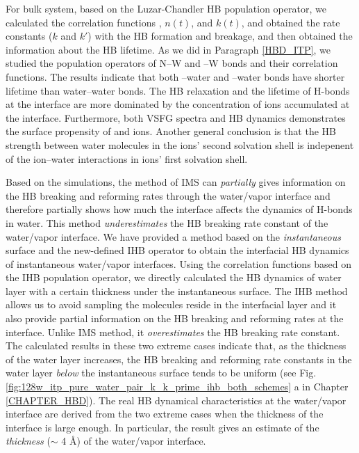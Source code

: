 For bulk system, based on the Luzar-Chandler HB population operator, 
we calculated the correlation functions \CHB, $n(t)$, and $k(t)$, and obtained the rate constants ($k$ and $k'$) with the HB formation and breakage, 
and then obtained the information about the HB lifetime. 
As we did in Paragraph \ref{HBD_ITP}, we studied the population operators of N--W 
and \I--W bonds and their correlation functions. 
The results indicate that both \nitrate--water and \I--water bonds have shorter lifetime than water--water bonds.
The HB relaxation and the lifetime of H-bonds
at the interface are more dominated by the concentration of ions accumulated at the interface. 
Furthermore, both VSFG spectra and HB dynamics demonstrates the surface propensity of \nitrate and \I ions.
Another general conclusion is that the HB strength between water molecules in the ions' second solvation shell is indepenent 
of the ion--water interactions in ions' first solvation shell.

Based on the simulations, the method of IMS can \emph{partially} gives information on the HB breaking and reforming
rates through the water/vapor interface and therefore partially shows how much the interface affects the dynamics of H-bonds in water. 
This method \emph{underestimates} the HB breaking rate constant of the water/vapor interface. 
We have provided a method based on the \emph{instantaneous} surface and the new-defined
IHB operator to obtain the interfacial HB dynamics of instantaneous water/vapor interfaces.  
Using the correlation functions based on the IHB population operator, we directly calculated the HB dynamics of water layer with a certain thickness 
under the instantaneous surface. 
The IHB method allows us to avoid sampling the molecules reside in the interfacial layer and
it also provide partial information on the HB breaking and reforming rates at the interface. 
Unlike IMS method, it \emph{overestimates} the HB breaking rate constant. The calculated results in these two extreme cases indicate that,
as the thickness of the water layer increases,
the HB breaking and reforming rate constants in the water layer \emph{below} the instantaneous surface tends to be uniform 
(see Fig.\thinspace\ref{fig:128w_itp_pure_water_pair_k_k_prime_ihb_both_schemes} a in Chapter \ref{CHAPTER_HBD}). 
The real HB dynamical characteristics at the water/vapor interface 
are derived from the two extreme cases when the thickness of the interface is large enough. 
In particular, the result gives an estimate of the \emph{thickness} ($\sim$ 4 \AA) of the water/vapor interface.  

